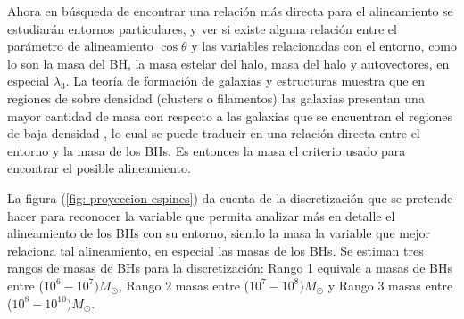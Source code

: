 Ahora en búsqueda de encontrar una relación más directa para el alineamiento se estudiarán entornos particulares, y ver si existe alguna relación entre el parámetro de alineamiento $\cos\theta$ y las variables relacionadas con el entorno, como lo son la masa del BH, la masa estelar del halo, masa del halo y autovectores, en especial $\lambda_{3}$. La teoría de formación de galaxias y estructuras muestra que en regiones de sobre densidad (clusters o filamentos) las galaxias presentan una mayor cantidad de masa  con respecto a las galaxias que se encuentran el regiones de baja densidad  \cite{zhao2015}, lo cual se puede traducir en una relación directa entre el entorno y la masa de los BHs. Es entonces la masa el criterio usado para encontrar el posible alineamiento. 

La figura (\ref{fig: proyeccion espines}) da cuenta de la discretización que se pretende hacer para reconocer la variable que permita analizar más en detalle el alineamiento de los BHs con su entorno,  
siendo la masa la variable que mejor relaciona tal alineamiento, en especial las masas de los BHs.
Se estiman tres rangos de masas de BHs para la discretización: Rango 1 equivale a masas de BHs entre ($10^6-10^7)M_{\odot}$, Rango 2 masas entre ($10^7-10^8)M_{\odot}$ y Rango 3 masas entre ($10^8-10^10)M_{\odot}$. 



